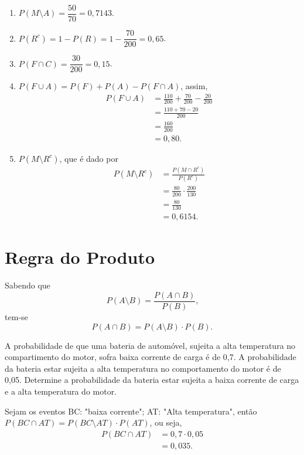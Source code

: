 \begin{pageWidthArea}
\begin{example}
\begin{multicols}{2}
\begin{enumerate}[label=\alph*), itemsep=10pt]
				\item $P(M\setminus A)=\dfrac{50}{70}=0,7143$.
		
				\item $P(R^c)=1-P(R)=1-\dfrac{70}{200}=0,65$.
		
				\item $P(F\cap C)=\dfrac{30}{200}=0,15$.
				
				\item $P(F\cup A) = P(F) + P(A) - P(F\cap A)$, assim,
				\begin{align*}
					P(F\cup A) &= \frac{110}{200}+\frac{70}{200}-\frac{20}{200}\\
							   &= \frac{110+70-20}{200}\\
							   &= \frac{160}{200}\\
							   &=0,80\text{.}
				\end{align*}
				
				\item $P(M\setminus R^c)$, que é dado por
				\begin{align*}
					P(M\setminus R^c) &= \frac{P(M\cap R^c)}{P(R^c)}\\
									  &= \frac{80}{200}\cdot \frac{200}{130}\\
									  &= \frac{80}{130}\\
									  &= 0,6154\text{.}
				\end{align*}
			\end{enumerate}
		\end{multicols}
	\end{example}
\end{pageWidthArea}

\section{Regra do Produto}

Sabendo que
\[
	P(A\setminus B)=\frac{P(A \cap B)}{P(B)}\text{,}
\]
tem-se
\begin{equation}
	P(A\cap B)=P(A\setminus B)\cdot P(B)\text{.}
\end{equation}

\begin{example}
	A probabilidade de que uma bateria de automóvel, sujeita a alta temperatura no compartimento do motor, sofra baixa corrente de carga é de 0,7. A probabilidade da bateria estar sujeita a alta temperatura no comportamento do motor é de 0,05. Determine a probabilidade da bateria estar sujeita a baixa corrente de carga e a alta temperatura do motor.
	
	Sejam os eventos BC: "baixa corrente"; AT: "Alta temperatura", então $P(BC\cap AT)=P(BC\setminus AT)\cdot P(AT)$, ou seja,
	\begin{align*}
		P(BC\cap AT)&=0,7\cdot 0,05\\
					&=0,035\text{.}
	\end{align*}
\end{example}

